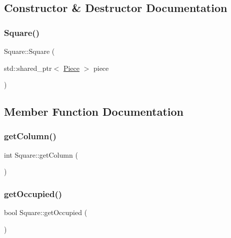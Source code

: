 \subsection{Constructor \& Destructor Documentation}
\mbox{\label{class_square_abddcf314d0cf5edc08cadc7a73c8e590}} 
\subsubsection{\texorpdfstring{Square()}{Square()}}
{\footnotesize\ttfamily Square\+::\+Square (\begin{DoxyParamCaption}\item[{std\+::shared\+\_\+ptr$<$ \hyperlink{class_piece}{Piece} $>$}]{piece }\end{DoxyParamCaption})}



\subsection{Member Function Documentation}
\mbox{\label{class_square_a03943abf111f746327da0682babe8375}} 
\subsubsection{\texorpdfstring{get\+Column()}{getColumn()}}
{\footnotesize\ttfamily int Square\+::get\+Column (\begin{DoxyParamCaption}{ }\end{DoxyParamCaption})}

\mbox{\label{class_square_a302ea5a61721ec621c5eac19766ff45f}} 
\subsubsection{\texorpdfstring{get\+Occupied()}{getOccupied()}}
{\footnotesize\ttfamily bool Square\+::get\+Occupied (\begin{DoxyParamCaption}{ }\end{DoxyParamCaption})}

\mbox{\label{class_square_add0bae19dd068f4ac9a5a3c54e0e088e}} 
